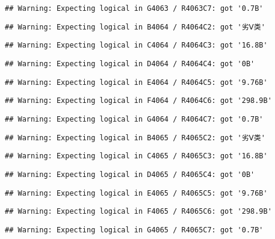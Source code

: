 \documentclass[
]{article}
\begin{document}
\begin{verbatim}
## Warning: Expecting logical in G4063 / R4063C7: got '0.7B'
\end{verbatim}

\begin{verbatim}
## Warning: Expecting logical in B4064 / R4064C2: got '劣Ⅴ类'
\end{verbatim}

\begin{verbatim}
## Warning: Expecting logical in C4064 / R4064C3: got '16.8B'
\end{verbatim}

\begin{verbatim}
## Warning: Expecting logical in D4064 / R4064C4: got '0B'
\end{verbatim}

\begin{verbatim}
## Warning: Expecting logical in E4064 / R4064C5: got '9.76B'
\end{verbatim}

\begin{verbatim}
## Warning: Expecting logical in F4064 / R4064C6: got '298.9B'
\end{verbatim}

\begin{verbatim}
## Warning: Expecting logical in G4064 / R4064C7: got '0.7B'
\end{verbatim}

\begin{verbatim}
## Warning: Expecting logical in B4065 / R4065C2: got '劣Ⅴ类'
\end{verbatim}

\begin{verbatim}
## Warning: Expecting logical in C4065 / R4065C3: got '16.8B'
\end{verbatim}

\begin{verbatim}
## Warning: Expecting logical in D4065 / R4065C4: got '0B'
\end{verbatim}

\begin{verbatim}
## Warning: Expecting logical in E4065 / R4065C5: got '9.76B'
\end{verbatim}

\begin{verbatim}
## Warning: Expecting logical in F4065 / R4065C6: got '298.9B'
\end{verbatim}

\begin{verbatim}
## Warning: Expecting logical in G4065 / R4065C7: got '0.7B'
\end{verbatim}
\end{document}
